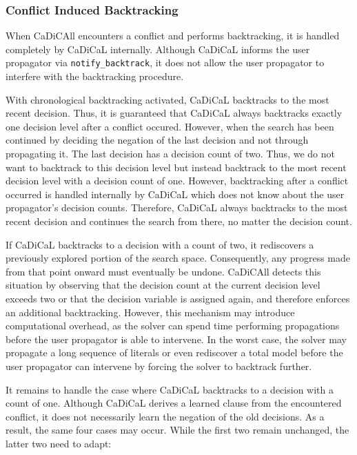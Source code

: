 \documentclass[12pt,a4paper]{article}
\begin{document}
\subsubsection{Conflict Induced Backtracking}
\label{sec:conflict_induced_backtracking}

When CaDiCAll encounters a conflict and performs backtracking, it is handled completely by CaDiCaL internally. Although CaDiCaL informs the user propagator via \verb|notify_backtrack|, it does not allow the user propagator to interfere with the backtracking procedure.

With chronological backtracking activated, CaDiCaL backtracks to the most recent decision. Thus, it is guaranteed that CaDiCaL always backtracks exactly one decision level after a conflict occured. However, when the search has been continued by deciding the negation of the last decision and not through propagating it. The last decision has a decision count of two. Thus, we do not want to backtrack to this decision level but instead backtrack to the most recent decision level with a decision count of one. However, backtracking after a conflict occurred is handled internally by CaDiCaL which does not know about the user propagator's decision counts. Therefore, CaDiCaL always backtracks to the most recent decision and continues the search from there, no matter the decision count.

If CaDiCaL backtracks to a decision with a count of two, it rediscovers a previously explored portion of the search space. Consequently, any progress made from that point onward must eventually be undone. CaDiCAll detects this situation by observing that the decision count at the current decision level exceeds two or that the decision variable is assigned again, and therefore enforces an additional backtracking. However, this mechanism may introduce computational overhead, as the solver can spend time performing propagations before the user propagator is able to intervene. In the worst case, the solver may propagate a long sequence of literals or even rediscover a total model before the user propagator can intervene by forcing the solver to backtrack further.

It remains to handle the case where CaDiCaL backtracks to a decision with a count of one. Although CaDiCaL derives a learned clause from the encountered conflict, it does not necessarily learn the negation of the old decisions. As a result, the same four cases may occur. While the first two remain unchanged, the latter two need to adapt:
\end{document}

